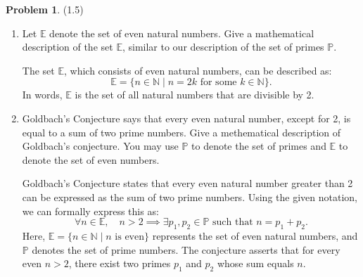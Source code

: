 \documentclass[12pt]{article}
\theoremstyle{definition}
\newtheorem{problem}{Problem}
\begin{document}
\begin{problem} (1.5)

    \begin{enumerate}[label=(\alph*)]
    \item Let $\mathbb{E}$ denote the set of even natural numbers. Give a mathematical description of the set
          $\mathbb{E}$, similar to our description of the set of primes $\mathbb{P}$. 

        \begin{solution}
            The set $\mathbb{E}$, which consists of even natural numbers, can be described as:
            \[
            \mathbb{E} = \{ n \in \mathbb{N} \mid n = 2k \text{ for some } k \in \mathbb{N} \}.
            \]
            In words, $\mathbb{E}$ is the set of all natural numbers that are divisible by 2.

        \end{solution}
    \item Goldbach's Conjecture says that every even natural number, except for 2, is equal to a sum of two prime numbers.
          Give a methematical description of Goldbach's conjecture. You may use $\mathbb{P}$ to denote the set of primes
          and $\mathbb{E}$ to denote the set of even numbers.

        \begin{solution}
            Goldbach's Conjecture states that every even natural number greater than 2 can be expressed as the sum of two prime numbers. Using the given notation, we can formally express this as:
            \[
            \forall n \in \mathbb{E}, \quad n > 2 \implies \exists p_1, p_2 \in \mathbb{P} \text{ such that } n = p_1 + p_2.
            \]
            Here, \(\mathbb{E} = \{ n \in \mathbb{N} \mid n \text{ is even} \}\) represents the set of even natural numbers, and \(\mathbb{P}\) denotes the set of prime numbers. The conjecture asserts that for every even \( n > 2 \), there exist two primes \( p_1 \) and \( p_2 \) whose sum equals \( n \).
        \end{solution}
    \end{enumerate}

\end{problem}
\end{document}
